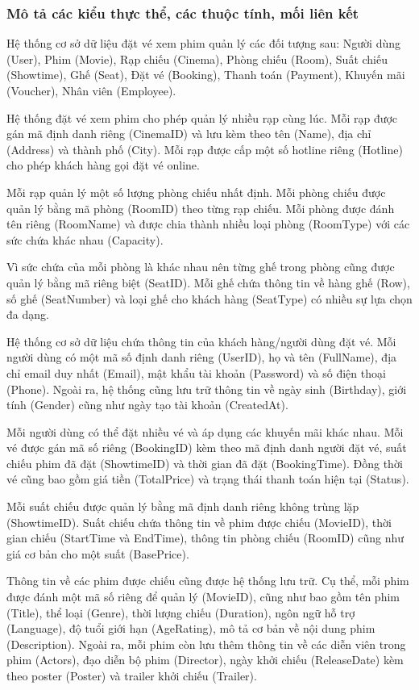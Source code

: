 \documentclass[a4paper]{article}
\newcommand{\cach}{\hspace*{1.5em}\ignorespaces}
\begin{document}
\subsubsection{Mô tả các kiểu thực thể, các thuộc tính, mối liên kết}
\cach Hệ thống cơ sở dữ liệu đặt vé xem phim quản lý các đối tượng sau: Người dùng (User), Phim (Movie), Rạp chiếu (Cinema), Phòng chiếu (Room), Suất chiếu (Showtime), Ghế (Seat), Đặt vé (Booking), Thanh toán (Payment), Khuyến mãi (Voucher), Nhân viên (Employee).

Hệ thống đặt vé xem phim cho phép quản lý nhiều rạp cùng lúc. Mỗi rạp được gán mã định danh riêng (CinemaID) và lưu kèm theo tên (Name), địa chỉ (Address) và thành phố (City). Mỗi rạp được cấp một số hotline riêng (Hotline) cho phép khách hàng gọi đặt vé online.

Mỗi rạp quản lý một số lượng phòng chiếu nhất định. Mỗi phòng chiếu được quản lý bằng mã phòng (RoomID) theo từng rạp chiếu. Mỗi phòng được đánh tên riêng (RoomName) và được chia thành nhiều loại phòng (RoomType) với các sức chứa khác nhau (Capacity).

Vì sức chứa của mỗi phòng là khác nhau nên từng ghế trong phòng cũng được quản lý bằng mã riêng biệt (SeatID). Mỗi ghế chứa thông tin về hàng ghế (Row), số ghế (SeatNumber) và loại ghế cho khách hàng (SeatType) có nhiều sự lựa chọn đa dạng.

Hệ thống cơ sở dữ liệu chứa thông tin của khách hàng/người dùng đặt vé. Mỗi người dùng có một mã số định danh riêng (UserID), họ và tên (FullName), địa chỉ email duy nhất (Email), mật khẩu tài khoản (Password) và số điện thoại (Phone). Ngoài ra, hệ thống cũng lưu trữ thông tin về ngày sinh (Birthday), giới tính (Gender) cũng như ngày tạo tài khoản (CreatedAt).

Mỗi người dùng có thể đặt nhiều vé và áp dụng các khuyến mãi khác nhau. Mỗi vé được gán mã số riêng (BookingID) kèm theo mã định danh người đặt vé, suất chiếu phim đã đặt (ShowtimeID) và thời gian đã đặt (BookingTime). Đồng thời vé cũng bao gồm giá tiền (TotalPrice) và trạng thái thanh toán hiện tại (Status).

Mỗi suất chiếu được quản lý bằng mã định danh riêng không trùng lặp (ShowtimeID). Suất chiếu chứa thông tin về phim được chiếu (MovieID), thời gian chiếu (StartTime và EndTime), thông tin phòng chiếu (RoomID) cũng như giá cơ bản cho một suất (BasePrice).

Thông tin về các phim được chiếu cũng được hệ thống lưu trữ. Cụ thể, mỗi phim được đánh một mã số riêng để quản lý (MovieID), cũng như bao gồm tên phim (Title), thể loại (Genre), thời lượng chiếu (Duration), ngôn ngữ hỗ trợ (Language), độ tuổi giới hạn (AgeRating), mô tả cơ bản về nội dung phim (Description). Ngoài ra, mỗi phim còn lưu thêm thông tin về 
các diễn viên trong phim (Actors), đạo diễn bộ phim (Director), ngày khởi chiếu (ReleaseDate) kèm theo poster (Poster) và trailer khởi chiếu (Trailer).
\end{document}
